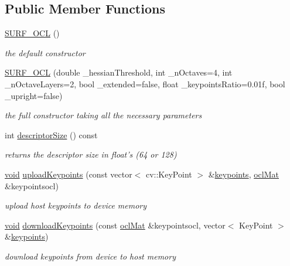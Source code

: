 \subsection*{Public Member Functions}
\begin{DoxyCompactItemize}
\item 
\hyperlink{classcv_1_1ocl_1_1SURF__OCL_add613a19d821691ea227315cf42676b7}{S\-U\-R\-F\-\_\-\-O\-C\-L} ()
\begin{DoxyCompactList}\small\item\em the default constructor \end{DoxyCompactList}\item 
\hyperlink{classcv_1_1ocl_1_1SURF__OCL_adac3951107e8e768e77f959200345a31}{S\-U\-R\-F\-\_\-\-O\-C\-L} (double \-\_\-hessian\-Threshold, int \-\_\-n\-Octaves=4, int \-\_\-n\-Octave\-Layers=2, bool \-\_\-extended=false, float \-\_\-keypoints\-Ratio=0.\-01f, bool \-\_\-upright=false)
\begin{DoxyCompactList}\small\item\em the full constructor taking all the necessary parameters \end{DoxyCompactList}\item 
int \hyperlink{classcv_1_1ocl_1_1SURF__OCL_abd081df5dda19bb9f6501968cc37510c}{descriptor\-Size} () const 
\begin{DoxyCompactList}\small\item\em returns the descriptor size in float's (64 or 128) \end{DoxyCompactList}\item 
\hyperlink{legacy_8hpp_a8bb47f092d473522721002c86c13b94e}{void} \hyperlink{classcv_1_1ocl_1_1SURF__OCL_a0becb122c1ca5cd5172fd40cd8655507}{upload\-Keypoints} (const vector$<$ cv\-::\-Key\-Point $>$ \&\hyperlink{compat_8hpp_af95b6678bbbdd664ed15fe6d4190d355}{keypoints}, \hyperlink{classcv_1_1ocl_1_1oclMat}{ocl\-Mat} \&keypointsocl)
\begin{DoxyCompactList}\small\item\em upload host keypoints to device memory \end{DoxyCompactList}\item 
\hyperlink{legacy_8hpp_a8bb47f092d473522721002c86c13b94e}{void} \hyperlink{classcv_1_1ocl_1_1SURF__OCL_aa9f92446712ec5a4472fe092a99c06f0}{download\-Keypoints} (const \hyperlink{classcv_1_1ocl_1_1oclMat}{ocl\-Mat} \&keypointsocl, vector$<$ Key\-Point $>$ \&\hyperlink{compat_8hpp_af95b6678bbbdd664ed15fe6d4190d355}{keypoints})
\begin{DoxyCompactList}\small\item\em download keypoints from device to host memory \end{DoxyCompactList}\item 

\end{DoxyCompactItemize}
